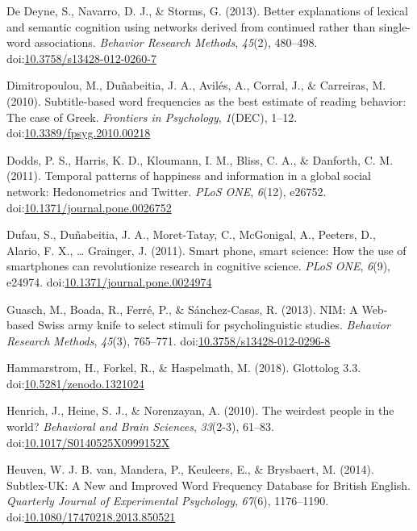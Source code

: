 \documentclass[english,,man]{apa6}
\theoremstyle{definition}
\theoremstyle{definition}
\theoremstyle{definition}
\theoremstyle{remark}
\begin{document}
\leavevmode\hypertarget{ref-DeDeyne2013}{}%
De Deyne, S., Navarro, D. J., \& Storms, G. (2013). Better explanations
of lexical and semantic cognition using networks derived from continued
rather than single-word associations. \emph{Behavior Research Methods},
\emph{45}(2), 480--498.
doi:\href{https://doi.org/10.3758/s13428-012-0260-7}{10.3758/s13428-012-0260-7}

\leavevmode\hypertarget{ref-Dimitropoulou2010}{}%
Dimitropoulou, M., Duñabeitia, J. A., Avilés, A., Corral, J., \&
Carreiras, M. (2010). Subtitle-based word frequencies as the best
estimate of reading behavior: The case of Greek. \emph{Frontiers in
Psychology}, \emph{1}(DEC), 1--12.
doi:\href{https://doi.org/10.3389/fpsyg.2010.00218}{10.3389/fpsyg.2010.00218}

\leavevmode\hypertarget{ref-Dodds2011}{}%
Dodds, P. S., Harris, K. D., Kloumann, I. M., Bliss, C. A., \& Danforth,
C. M. (2011). Temporal patterns of happiness and information in a global
social network: Hedonometrics and Twitter. \emph{PLoS ONE},
\emph{6}(12), e26752.
doi:\href{https://doi.org/10.1371/journal.pone.0026752}{10.1371/journal.pone.0026752}

\leavevmode\hypertarget{ref-Dufau2011}{}%
Dufau, S., Duñabeitia, J. A., Moret-Tatay, C., McGonigal, A., Peeters,
D., Alario, F. X., \ldots{} Grainger, J. (2011). Smart phone, smart
science: How the use of smartphones can revolutionize research in
cognitive science. \emph{PLoS ONE}, \emph{6}(9), e24974.
doi:\href{https://doi.org/10.1371/journal.pone.0024974}{10.1371/journal.pone.0024974}

\leavevmode\hypertarget{ref-Guasch2013}{}%
Guasch, M., Boada, R., Ferré, P., \& Sánchez-Casas, R. (2013). NIM: A
Web-based Swiss army knife to select stimuli for psycholinguistic
studies. \emph{Behavior Research Methods}, \emph{45}(3), 765--771.
doi:\href{https://doi.org/10.3758/s13428-012-0296-8}{10.3758/s13428-012-0296-8}

\leavevmode\hypertarget{ref-Glottolog}{}%
Hammarstrom, H., Forkel, R., \& Haspelmath, M. (2018). Glottolog 3.3.
doi:\href{https://doi.org/10.5281/zenodo.1321024}{10.5281/zenodo.1321024}

\leavevmode\hypertarget{ref-Henrich2010}{}%
Henrich, J., Heine, S. J., \& Norenzayan, A. (2010). The weirdest people
in the world? \emph{Behavioral and Brain Sciences}, \emph{33}(2-3),
61--83.
doi:\href{https://doi.org/10.1017/S0140525X0999152X}{10.1017/S0140525X0999152X}

\leavevmode\hypertarget{ref-VanHeuven2014}{}%
Heuven, W. J. B. van, Mandera, P., Keuleers, E., \& Brysbaert, M.
(2014). Subtlex-UK: A New and Improved Word Frequency Database for
British English. \emph{Quarterly Journal of Experimental Psychology},
\emph{67}(6), 1176--1190.
doi:\href{https://doi.org/10.1080/17470218.2013.850521}{10.1080/17470218.2013.850521}
\end{document}
